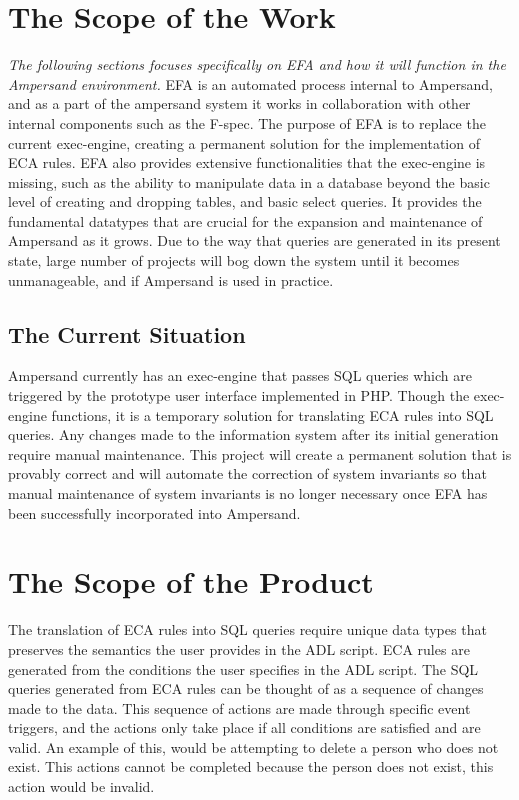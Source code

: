 \documentclass[12pt]{report}
\begin{document}
\section{The Scope of the Work}\label{sec:ScopeOfWork}
\textit{The following sections focuses specifically on EFA and how it will 
function in the Ampersand environment.}
EFA is an automated process internal to Ampersand, and as a part of the 
ampersand system it works in collaboration with other internal components such 
as the F-spec. The purpose of EFA is to replace the current exec-engine, 
creating a permanent solution for the implementation of ECA rules. EFA also 
provides extensive functionalities that the exec-engine is missing, such as the 
ability to manipulate data in a database beyond the basic level of creating and 
dropping tables, and basic select queries. It provides the fundamental 
datatypes that are crucial for the expansion and maintenance of Ampersand as it 
grows. Due to the way that queries are generated in its present state, large 
number of projects will bog down the system until it becomes unmanageable, and 
if Ampersand is used in practice.

\subsection{The Current Situation} %

Ampersand currently has an exec-engine that passes SQL queries which are 
triggered by the prototype user interface implemented in PHP. Though the 
exec-engine functions, it is a temporary solution for translating ECA rules 
into SQL queries. Any changes made to the information system after its initial 
generation require manual maintenance. This project will create a permanent 
solution that is provably correct and will automate the correction of system 
invariants so that manual maintenance of system invariants is no longer 
necessary once EFA has been successfully incorporated into Ampersand.

\section{The Scope of the Product}\label{sec:ScopeOfProduct}
The translation of ECA rules into SQL queries require unique data types that 
preserves the semantics the user provides in the ADL script. ECA rules are 
generated from the conditions the user specifies in the ADL script. The SQL 
queries generated from ECA rules can be thought of as a sequence of changes 
made to the data. This sequence of actions are made through specific event 
triggers, and the actions only take place if all conditions are satisfied and 
are valid. An example of this, would be attempting to delete a person who does 
not exist. This actions cannot be completed because the person does not exist, 
this action would be invalid. 
\end{document}

